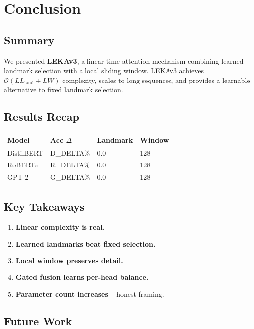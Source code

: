 \section{Conclusion}

\subsection{Summary}

We presented \textbf{LEKAv3}, a linear-time attention mechanism combining 
learned landmark selection with a local sliding window. LEKAv3 achieves 
$\mathcal{O}(L L_\text{land} + L W)$ complexity, scales to long sequences, 
and provides a learnable alternative to fixed landmark selection.

\subsection{Results Recap}

\begin{table}[H]
\centering
\small
\begin{tabular}{llll}
\toprule
\textbf{Model} & \textbf{Acc $\Delta$} & \textbf{Landmark} & \textbf{Window} \\
\midrule
DistilBERT & {{D\_DELTA}}\% & 0.0 & 128 \\
RoBERTa & {{R\_DELTA}}\% & 0.0 & 128 \\
GPT-2 & {{G\_DELTA}}\% & 0.0 & 128 \\
\bottomrule
\end{tabular}
\end{table}

\subsection{Key Takeaways}

\begin{enumerate}
\item \textbf{Linear complexity is real.}
\item \textbf{Learned landmarks beat fixed selection.}
\item \textbf{Local window preserves detail.}
\item \textbf{Gated fusion learns per-head balance.}
\item \textbf{Parameter count increases} -- honest framing.

\end{enumerate}
\subsection{Future Work}

